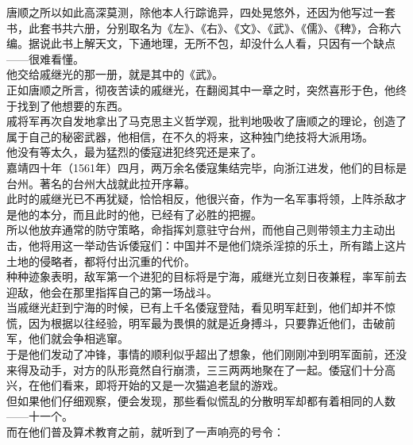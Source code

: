 \begin{multicols}{\theparacolNo}
唐顺之所以如此高深莫测，除他本人行踪诡异，四处晃悠外，还因为他写过一套书，此套书共六册，分别取名为《左》、《右》、《文》、《武》、《儒》、《稗》，合称六编。据说此书上解天文，下通地理，无所不包，却没什么人看，只因有一个缺点——很难看懂。\\

他交给戚继光的那一册，就是其中的《武》。\\

正如唐顺之所言，彻夜苦读的戚继光，在翻阅其中一章之时，突然喜形于色，他终于找到了他想要的东西。\\

戚将军再次自发地拿出了马克思主义哲学观，批判地吸收了唐顺之的理论，创造了属于自己的秘密武器，他相信，在不久的将来，这种独门绝技将大派用场。\\

他没有等太久，最为猛烈的倭寇进犯终究还是来了。\\

嘉靖四十年（1561年）四月，两万余名倭寇集结完毕，向浙江进发，他们的目标是台州。著名的台州大战就此拉开序幕。\\

此时的戚继光已不再犹疑，恰恰相反，他很兴奋，作为一名军事将领，上阵杀敌才是他的本分，而且此时的他，已经有了必胜的把握。\\

所以他放弃通常的防守策略，命指挥刘意驻守台州，而他自己则带领主力主动出击，他将用这一举动告诉倭寇们：中国并不是他们烧杀淫掠的乐土，所有踏上这片土地的侵略者，都将付出沉重的代价。\\

种种迹象表明，敌军第一个进犯的目标将是宁海，戚继光立刻日夜兼程，率军前去迎敌，他会在那里指挥自己的第一场战斗。\\

当戚继光赶到宁海的时候，已有上千名倭寇登陆，看见明军赶到，他们却并不惊慌，因为根据以往经验，明军最为畏惧的就是近身搏斗，只要靠近他们，击破前军，他们就会争相逃窜。\\

于是他们发动了冲锋，事情的顺利似乎超出了想象，他们刚刚冲到明军面前，还没来得及动手，对方的队形竟然自行崩溃，三三两两地聚在了一起。倭寇们十分高兴，在他们看来，即将开始的又是一次猫追老鼠的游戏。\\

但如果他们仔细观察，便会发现，那些看似慌乱的分散明军却都有着相同的人数——十一个。\\

而在他们普及算术教育之前，就听到了一声响亮的号令：\\


\end{multicols}
